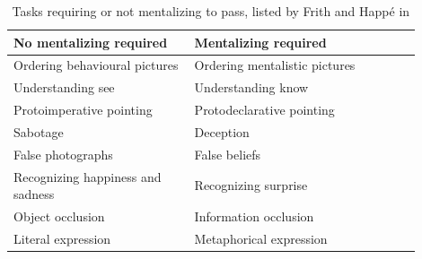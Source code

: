 \begin{table}[h]
    \centering
    \begin{tabular}{p{0.4\linewidth}p{0.5\linewidth}}
        \toprule
        No mentalizing required           & Mentalizing required          \\
        \midrule
        Ordering behavioural pictures     & Ordering mentalistic pictures\parencite{baron1986mechanical} \\
        Understanding see                 & Understanding know\parencite{perner1989exploration}            \\
        Protoimperative pointing          & Protodeclarative pointing\parencite{baron1989perceptual}     \\
        Sabotage                          & Deception\parencite{sodian1992deception}                     \\
        False photographs                 & False beliefs\parencite{leslie1992domain}                 \\
        Recognizing happiness and sadness & Recognizing surprise\parencite{baron1993children}          \\
        Object occlusion                  & Information occlusion\parencite{baron1992out}         \\
        Literal expression                & Metaphorical expression\parencite{happe1993communicative}       \\
        \bottomrule
    \end{tabular}
    \caption{\small Tasks requiring or not mentalizing to pass, listed by Frith and Happé in\parencite{frith1994autism}}
    \label{mentalizing-tasks}
\end{table}

